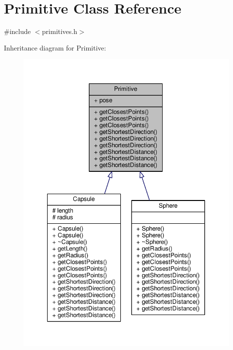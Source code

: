 \hypertarget{class_primitive}{}\section{Primitive Class Reference}
\label{class_primitive}


{\ttfamily \#include $<$primitives.\+h$>$}



Inheritance diagram for Primitive\+:\nopagebreak
\begin{figure}[H]
\begin{center}
\leavevmode
\includegraphics[width=340pt]{class_primitive__inherit__graph}
\end{center}
\end{figure}


